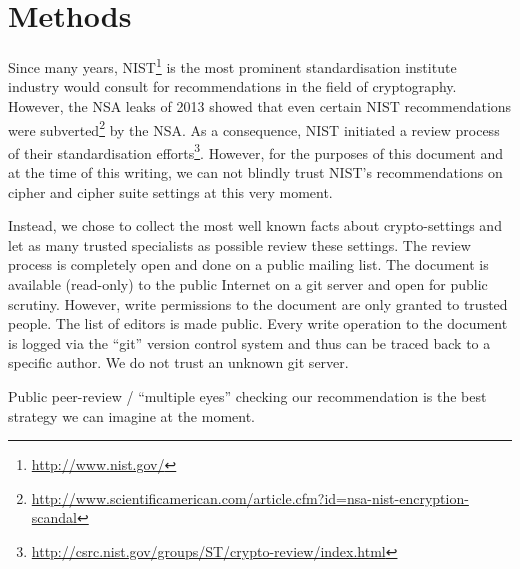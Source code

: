 \section{Methods}

Since many years, NIST\footnote{\url{http://www.nist.gov/}} is the most
prominent standardisation institute industry would consult for recommendations
in the field of cryptography. However, the NSA leaks of 2013 showed that even
certain NIST recommendations were
subverted\footnote{\url{http://www.scientificamerican.com/article.cfm?id=nsa-nist-encryption-scandal}}
by the NSA.  As a consequence, NIST initiated a review process of their
standardisation
efforts\footnote{\url{http://csrc.nist.gov/groups/ST/crypto-review/index.html}}.
However, for the purposes of this document and at the time of this writing, we
can not blindly trust NIST's recommendations on cipher and cipher suite
settings at this very moment. 

Instead, we chose to collect the most well known facts about crypto-settings
and let as many trusted specialists as possible review these settings.  The
review process is completely open and done on a public mailing list. The
document is available (read-only) to the public Internet on a git server and
open for public scrutiny. However, write permissions to the document are only
granted to trusted people. The list of editors is made public.  Every write
operation to the document is logged via the ``git'' version control system and
thus can be traced back to a specific author.  We do not trust an unknown git
server. 

Public peer-review / ``multiple eyes'' checking our recommendation is the best
strategy we can imagine at the moment.




